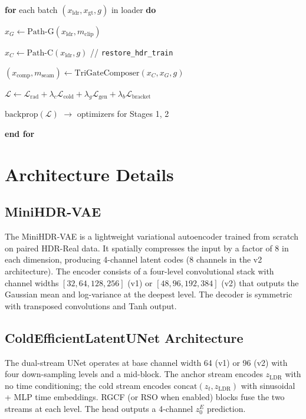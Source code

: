 \documentclass[10pt,twocolumn,letterpaper]{article}
\makeatletter
\newcounter{alg@ln}
\newlength{\alg@ind}
\newenvironment{algorithmic}[1][0]{%
  \setcounter{alg@ln}{0}\setlength{\alg@ind}{0pt}%
  \par\footnotesize\ttfamily
  \begin{list}{}{%
    \setlength{\leftmargin}{1.8em}\setlength{\labelwidth}{1.2em}%
    \setlength{\labelsep}{0.4em}\setlength{\topsep}{2pt}%
    \setlength{\itemsep}{0pt}\setlength{\parsep}{0pt}}%
}{%
  \end{list}\par
}
\newcommand{\alg@item}{\item[\stepcounter{alg@ln}{\scriptsize\arabic{alg@ln}:}]\hspace*{\alg@ind}}
\newcommand{\STATE}{\alg@item}
\newcommand{\FOR}[1]{\alg@item\textbf{for} #1 \textbf{do}\addtolength{\alg@ind}{1.2em}}
\newcommand{\ENDFOR}{\addtolength{\alg@ind}{-1.2em}\alg@item\textbf{end for}}
\newcommand{\Lrad}{\mathcal{L}_{\mathrm{rad}}}
\newcommand{\Lcold}{\mathcal{L}_{\mathrm{cold}}}
\newcommand{\Lgen}{\mathcal{L}_{\mathrm{gen}}}
\newcommand{\Lbracket}{\mathcal{L}_{\mathrm{bracket}}}
\newcommand{\xldr}{x_{\mathrm{ldr}}}
\makeatother
\begin{document}
\begin{algorithm}[t]
\caption{GPURE-Joint Training Step}
\label{alg:joint}
\begin{algorithmic}[1]
\FOR{each batch $(\xldr, x_{\mathrm{gt}}, g)$ in loader}
  \STATE $x_G \leftarrow \mathrm{Path\text{-}G}(\xldr, m_{\mathrm{clip}})$
  \STATE $x_C \leftarrow \mathrm{Path\text{-}C}(\xldr, g)$ \hfill // \texttt{restore\_hdr\_train}
  \STATE $(x_{\mathrm{comp}}, m_{\mathrm{seam}}) \leftarrow \mathrm{TriGateComposer}(x_C, x_G, g)$
  \STATE $\mathcal{L} \leftarrow \Lrad + \lambda_c \Lcold + \lambda_g \Lgen + \lambda_b \Lbracket$
  \STATE $\mathrm{backprop}(\mathcal{L})$ $\rightarrow$ optimizers for Stages 1, 2
\ENDFOR
\end{algorithmic}
\end{algorithm}

\section{Architecture Details}
\label{sec:architecture}

\subsection{MiniHDR-VAE}

The MiniHDR-VAE is a lightweight variational autoencoder trained from scratch on paired HDR-Real data. It spatially compresses the input by a factor of 8 in each dimension, producing 4-channel latent codes (8 channels in the v2 architecture). The encoder consists of a four-level convolutional stack with channel widths $[32,64,128,256]$ (v1) or $[48,96,192,384]$ (v2) that outputs the Gaussian mean and log-variance at the deepest level. The decoder is symmetric with transposed convolutions and Tanh output.

\subsection{ColdEfficientLatentUNet Architecture}

The dual-stream UNet operates at base channel width 64 (v1) or 96 (v2) with four down-sampling levels and a mid-block. The anchor stream encodes $z_{\mathrm{LDR}}$ with no time conditioning; the cold stream encodes $\mathrm{concat}(z_t, z_{\mathrm{LDR}})$ with sinusoidal + MLP time embeddings. RGCF (or RSO when enabled) blocks fuse the two streams at each level. The head outputs a 4-channel $z_0^E$ prediction.
\end{document}
